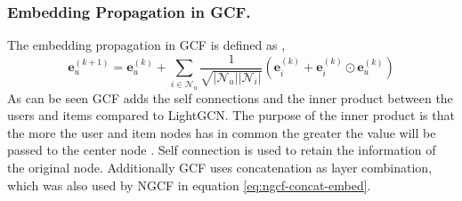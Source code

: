 \subsubsection{Embedding Propagation in GCF.}
The embedding propagation in GCF is defined as \cite{BiTGCF},
\begin{equation}
    \mathbf{e}_{u}^{(k+1)} = \mathbf{e}_{u}^{(k)} + \sum^{}_{i \in \mathcal{N}_u}  \frac{1}{\sqrt{|\mathcal{N}_u||\mathcal{N}_i|}}\left( \mathbf{e}_i^{(k)} + \mathbf{e}_i^{(k)} \odot \mathbf{e}_u^{(k)} \right)
\end{equation}
As can be seen GCF adds the self connections and the inner product between the users and items compared to LightGCN.
The purpose of the inner product is that the more the user and item nodes has in common the greater the value will be passed to the center node \cite{BiTGCF}.
Self connection is used to retain the information of the original node.
Additionally GCF uses concatenation as layer combination, which was also used by NGCF in equation \autoref{eq:ngcf-concat-embed}.
